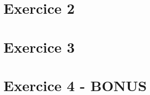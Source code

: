 \documentclass[12pt,a4paper]{article}
\begin{document}
\vspace*{0.7cm}



\newpage

\section{Exercice 2}

\vspace*{0.7cm}



\newpage

\section{Exercice 3}

\vspace*{0.7cm}



\newpage

\section{Exercice 4 - BONUS}

\vspace*{0.7cm}


\end{document}
